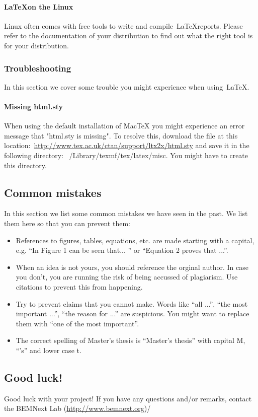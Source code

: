\documentclass{latex-format/stylesheets/BEMNextstyle}
\begin{document}
\paragraph*{\LaTeX on the Linux}
Linux often comes with free tools to write and compile~\LaTeX reports. Please refer to the documentation of your distribution to find out what the right tool is for your distribution.

\subsubsection*{Troubleshooting}
In this section we cover some trouble you might experience when using~\LaTeX.

\paragraph*{Missing html.sty}
When using the default installation of MacTeX you might experience an error message that "html.sty is missing". To resolve this, download the file at this location:~\url{http://www.tex.ac.uk/ctan/support/ltx2x/html.sty} and save it in the following directory: ~/Library/texmf/tex/latex/misc. You might have to create this directory.

\subsection*{Common mistakes}
In this section we list some common mistakes we have seen in the past. We list them here so that you can prevent them:
\begin{itemize}
\item References to figures, tables, equations, etc. are made starting with a capital, e.g. ``In Figure 1 can be seen that... '' or ``Equation 2 proves that ...''.
\item When an idea is not yours, you should reference the orginal author. In case you don't, you are running the risk of being accussed of plagiarism. Use citations to prevent this from happening.
\item Try to prevent claims that you cannot make. Words like ``all ...'', ``the most important ...'', ``the reason for ...'' are suspicious. You might want to replace them with ``one of the most important''.
\item The correct spelling of Master's thesis is ``Master's thesis'' with capital M, ``'s'' and lower case t.
\end{itemize}

\subsection*{Good luck!}
Good luck with your project! If you have any questions and/or remarks, contact the BEMNext Lab (\url{http://www.bemnext.org})/
\end{document}
